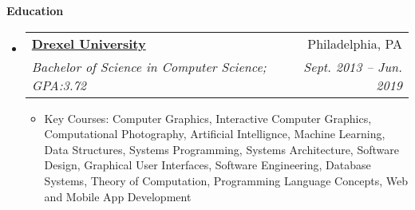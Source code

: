 \documentclass[letterpaper,11pt]{article}
\makeatletter
\newcommand{\resitem}[1]{\item #1 \vspace{-2pt}}
\newcommand{\resheading}[1]{{\large \colorbox{mygrey}{\begin{minipage}{\textwidth}{\textbf{#1 \vphantom{p\^{E}}}}\end{minipage}}}}
\newcommand{\ressubheading}[4]{
\begin{tabular*}{6.5in}{l@{\extracolsep{\fill}}r}
		\textbf{#1} & #2 \\
		\textit{#3} & \textit{#4} \\
\end{tabular*}\vspace{-6pt}}
\newcommand{\smallsect}[1]{{\footnotesize #1}}
\makeatother
\begin{document}
\resheading{Education}
\begin{itemize}
	\item \ressubheading{\href{https://drexel.edu/}{Drexel University}}{Philadelphia, PA}{Bachelor of Science in Computer Science; GPA:3.72}{Sept. 2013 -- Jun. 2019}
		\smallsect{
		\begin{itemize}
			\resitem{Key Courses: Computer Graphics, Interactive Computer Graphics, Computational Photography, Artificial Intellignce, Machine Learning, Data Structures, Systems Programming, Systems Architecture, Software Design, Graphical User Interfaces, Software Engineering, Database Systems, Theory of Computation, Programming Language Concepts, Web and Mobile App Development}
		\end{itemize}
		}
\end{itemize}
\end{document}
